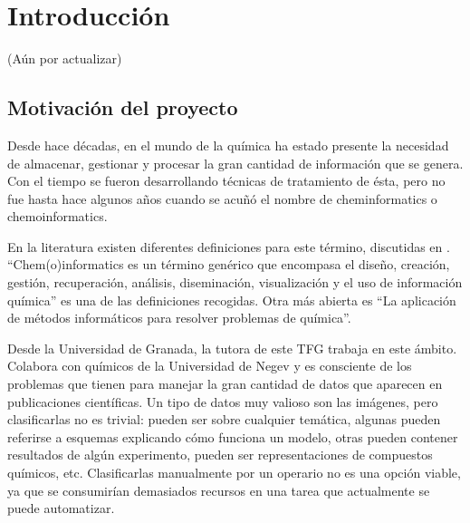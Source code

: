 \chapter{Introducción} \label{intro}




(Aún por actualizar)

\section{Motivación del proyecto}
Desde hace décadas, en el mundo de la química ha estado presente la necesidad de almacenar, gestionar y procesar la gran cantidad de información que se genera. Con el tiempo se fueron desarrollando técnicas de tratamiento de ésta, pero no fue hasta hace algunos años cuando se acuñó el nombre de cheminformatics o chemoinformatics. 

En la literatura existen diferentes definiciones para este término, discutidas en \cite{doi:10.1021/ci600234z}. ``Chem(o)informatics es un término genérico que encompasa el diseño, creación, gestión, recuperación, análisis, diseminación, visualización y el uso de información química'' es una de las definiciones recogidas. Otra más abierta es ``La aplicación de métodos informáticos para resolver problemas de química''. 

Desde la Universidad de Granada, la tutora de este TFG trabaja en este ámbito. Colabora con químicos de la Universidad de Negev y es consciente de los problemas que tienen para manejar la gran cantidad de datos que aparecen en publicaciones científicas. Un tipo de datos muy valioso son las imágenes, pero clasificarlas no es trivial: pueden ser sobre cualquier temática, algunas pueden referirse a esquemas explicando cómo funciona un modelo, otras pueden contener resultados de algún experimento, pueden ser representaciones de compuestos químicos, etc. Clasificarlas manualmente por un operario no es una opción viable, ya que se consumirían demasiados recursos en una tarea que actualmente se puede automatizar.

